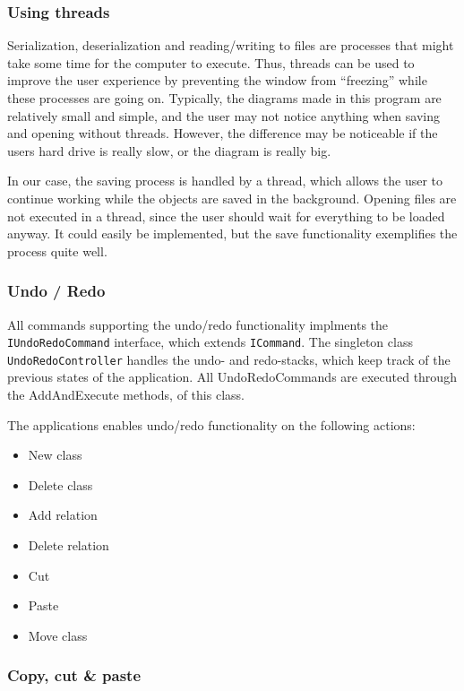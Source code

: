 \subsubsection{Using threads}
Serialization, deserialization and reading/writing
to files are processes that might take some time for the computer to execute.
Thus, threads can be used to improve the user experience by preventing the
window from “freezing” while these processes are going on. Typically, the
diagrams made in this program are relatively small and simple, and the user may
not notice anything when saving and opening without threads. However, the
difference may be noticeable if the users hard drive is really slow, or the
diagram is really big.

In our case, the saving process is handled by a thread, which allows the user to
continue working while the objects are saved in the background. Opening files
are not executed in a thread, since the user should wait for everything to be
loaded anyway. It could easily be implemented, but the save functionality
exemplifies the process quite well.


\subsubsection{Undo / Redo}
All commands supporting the undo/redo functionality implments the
\texttt{IUndoRedoCommand} interface, which extends \texttt{ICommand}. The 
singleton class
\texttt{UndoRedoController} handles the undo- and redo-stacks, which keep track 
of the
previous states of the application. All UndoRedoCommands are executed through
the AddAndExecute methods, of this class.

The applications enables undo/redo functionality on the following actions:


\begin{itemize}
	\item New class
	\item Delete class
	\item Add relation
	\item Delete relation
	\item Cut
	\item Paste
	\item Move class
\end{itemize}


\subsubsection{Copy, cut \& paste}

